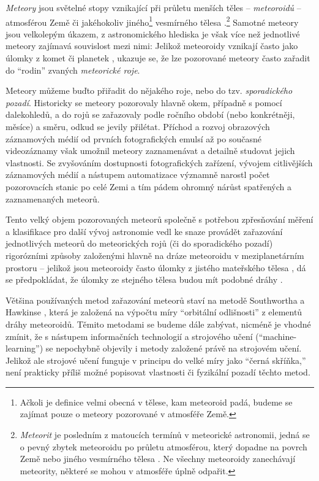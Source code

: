 
\textit{Meteory} jsou světelné stopy  vznikající při průletu menších těles -- \textit{meteoroidů} -- atmosférou Země či jakéhokoliv jiného\footnote{Ačkoli je definice \cite{meteorastro} velmi obecná v tělese, kam meteoroid padá, budeme se zajímat pouze o meteory pozorované v atmosféře Země.} vesmírného tělesa \cite{meteorastro}.\footnote{\textit{Meteorit} je posledním z matoucích termínů v meteorické astronomii, jedná se o pevný zbytek meteoroidu po průletu atmosférou, který dopadne na povrch Země nebo jiného vesmírného tělesa \cite{meteorastro}. Ne všechny meteoroidy zanechávají meteority, některé se mohou v atmosféře úplně odpařit.} Samotné meteory jsou velkolepým úkazem, z astronomického hlediska je však více než jednotlivé meteory zajímavá souvislost mezi nimi: Jelikož meteoroidy vznikají často jako úlomky z komet či planetek \cite{meteorastro}\cite{cometassoc}, ukazuje se, že lze pozorované meteory často zařadit do "`rodin"' zvaných \textit{meteorické roje}.

Meteory můžeme buďto přiřadit do nějakého roje, nebo do tzv. \textit{sporadického pozadí}.  Historicky se meteory pozorovaly hlavně okem, případně s pomocí dalekohledů, a do rojů se zařazovaly podle ročního období (nebo konkrétněji, měsíce) a směru, odkud se jevily přilétat. Příchod a rozvoj obrazových záznamových médií od prvních fotografických emulsí až po současné videozáznamy však umožnil meteory zaznamenávat a detailně studovat jejich vlastnosti. Se zvyšováním dostupnosti fotografických zařízení, vývojem citlivějších záznamových médií a nástupem automatizace významně narostl počet pozorovacích stanic po celé Zemi a tím pádem ohromný nárůst spatřených a zaznamenaných meteorů.

Tento velký objem pozorovaných meteorů společně s potřebou zpřesňování měření a klasifikace pro další vývoj astronomie vedl ke snaze provádět zařazování jednotlivých meteorů do meteorických rojů (či do sporadického pozadí) rigorózními způsoby založenými hlavně na dráze meteoroidu \cite{dsh} v meziplanetárním prostoru -- jelikož jsou meteoroidy často úlomky z jistého mateřského tělesa \cite{meteorastro}\cite{cometassoc}, dá se předpokládat, že úlomky ze stejného tělesa budou mít podobné dráhy \cite{dsh}.

Většina používaných metod zařazování meteorů staví na metodě Southwortha a Hawkinse \cite{dsh}, která je založená na výpočtu míry "`orbitální odlišnosti"' z elementů dráhy meteoroidů. Těmito metodami se budeme dále zabývat, nicméně je vhodné zmínit, že s nástupem informačních technologií a strojového učení ("`machine-learning"') se nepochybně objevily i metody založené právě na strojovém učení. Jelikož ale strojové učení funguje v principu do velké míry jako "`černá skříňka,"' není prakticky příliš možné popisovat vlastnosti či fyzikální pozadí těchto metod.

\medskip

